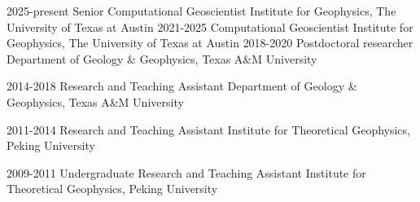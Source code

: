 

\begin{cvskills}
  \cvskill
    {2025-present} %
    {Senior Computational Geoscientist} %
    {Institute for Geophysics, The University of Texas at Austin} %
  \cvskill
    {2021-2025} %
    {Computational Geoscientist} %
    {Institute for Geophysics, The University of Texas at Austin} %
  \cvskill
    {2018-2020} %
    {Postdoctoral researcher} %
    {Department of Geology \& Geophysics, Texas A\&M University} %

  \cvskill
    {2014-2018} %
    {Research and Teaching Assistant} %
    {Department of Geology \& Geophysics, Texas A\&M University} %

  \cvskill
    {2011-2014} %
    {Research and Teaching Assistant} %
    {Institute for Theoretical Geophysics, Peking University} %

  \cvskill
    {2009-2011} %
    {Undergraduate Research and Teaching Assistant} %
    {Institute for Theoretical Geophysics, Peking University} %

\end{cvskills}
